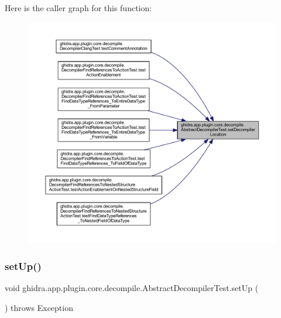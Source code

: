Here is the caller graph for this function\+:
\nopagebreak
\begin{figure}[H]
\begin{center}
\leavevmode
\includegraphics[width=350pt]{classghidra_1_1app_1_1plugin_1_1core_1_1decompile_1_1_abstract_decompiler_test_ab96f45f00a2a62697ba177bd42a608c6_icgraph}
\end{center}
\end{figure}
\mbox{\label{classghidra_1_1app_1_1plugin_1_1core_1_1decompile_1_1_abstract_decompiler_test_a2954516a95013451596f225b6fca7977}} 
\subsubsection{\texorpdfstring{setUp()}{setUp()}}
{\footnotesize\ttfamily void ghidra.\+app.\+plugin.\+core.\+decompile.\+Abstract\+Decompiler\+Test.\+set\+Up (\begin{DoxyParamCaption}{ }\end{DoxyParamCaption}) throws Exception\hspace{0.3cm}{\ttfamily [inline]}}




